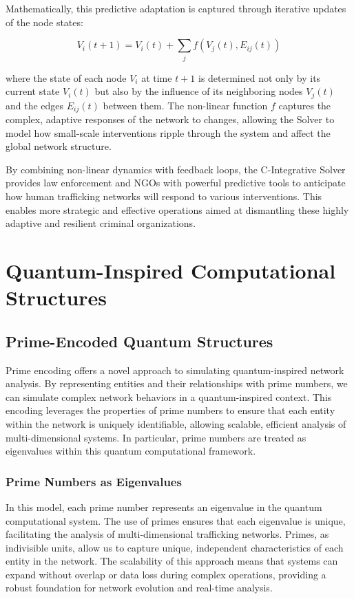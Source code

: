 \documentclass[%
 preprint, linenumbers,
 amsmath,amssymb,
 aps, physrev,
]{revtex4-2}
\begin{document}
Mathematically, this predictive adaptation is captured through iterative updates of the node states:

\[
V_i(t+1) = V_i(t) + \sum_{j} f(V_j(t), E_{ij}(t))
\]

where the state of each node \( V_i \) at time \( t+1 \) is determined not only by its current state \( V_i(t) \) but also by the influence of its neighboring nodes \( V_j(t) \) and the edges \( E_{ij}(t) \) between them. The non-linear function \( f \) captures the complex, adaptive responses of the network to changes, allowing the Solver to model how small-scale interventions ripple through the system and affect the global network structure.

By combining non-linear dynamics with feedback loops, the C-Integrative Solver provides law enforcement and NGOs with powerful predictive tools to anticipate how human trafficking networks will respond to various interventions. This enables more strategic and effective operations aimed at dismantling these highly adaptive and resilient criminal organizations.
\section{Quantum-Inspired Computational Structures}

\subsection{Prime-Encoded Quantum Structures}

Prime encoding offers a novel approach to simulating quantum-inspired network analysis. By representing entities and their relationships with prime numbers, we can simulate complex network behaviors in a quantum-inspired context. This encoding leverages the properties of prime numbers to ensure that each entity within the network is uniquely identifiable, allowing scalable, efficient analysis of multi-dimensional systems. In particular, prime numbers are treated as eigenvalues within this quantum computational framework.

\subsubsection{Prime Numbers as Eigenvalues}

In this model, each prime number represents an eigenvalue in the quantum computational system. The use of primes ensures that each eigenvalue is unique, facilitating the analysis of multi-dimensional trafficking networks. Primes, as indivisible units, allow us to capture unique, independent characteristics of each entity in the network. The scalability of this approach means that systems can expand without overlap or data loss during complex operations, providing a robust foundation for network evolution and real-time analysis.
\end{document}
